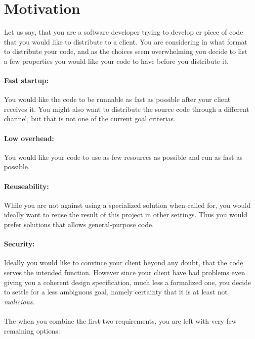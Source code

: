 \section{Motivation}

Let us say, that you are a software developer trying to develop er piece of code
that you would like to distribute to a client. You are considering in what
format to distribute your code, and as the choices seem overwhelming you decide
to list a few properties you would like your code to have before you distribute
it.

\paragraph{Fast startup:} You would like the code to be runnable as fast as
possible after your client receives it. You might also want to distribute the
source code through a different channel, but that is not one of the current goal
criterias.

\paragraph{Low overhead:} You would like your code to use as few resources as
possible and run as fast as possible.

\paragraph{Reuseability:} While you are not against using a specialized solution
when called for, you would ideally want to reuse the result of this project in
other settings. Thus you would prefer solutions that allows general-purpose
code.

\paragraph{Security:} Ideally you would like to convince your client beyond any
doubt, that the code serves the intended function. However since your client
have had problems even giving you a coherent design specification, much less a
formalized one, you decide to settle for a less ambiguous goal, namely certainty
that it is at least not \emph{malicious}.

\paragraph{}
The when you combine the first two requirements, you are left with very few
remaining options:


